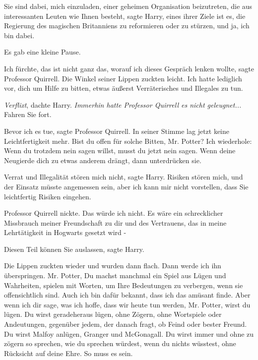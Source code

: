 \glqq{}Sie sind dabei, mich einzuladen, einer geheimen Organisation beizutreten,
die aus interessanten Leuten wie Ihnen besteht\grqq{}, sagte Harry, \glqq{}eines
ihrer Ziele ist es, die Regierung des magischen Britanniens zu reformieren oder
zu stürzen, und ja, ich bin dabei.\grqq{}

Es gab eine kleine Pause.

\glqq{}Ich fürchte, das ist nicht ganz das, worauf ich dieses Gespräch lenken
wollte\grqq{}, sagte Professor Quirrell. Die Winkel seiner Lippen zuckten
leicht. \glqq{}Ich hatte lediglich vor, dich um Hilfe zu bitten, etwas äußerst
Verräterisches und Illegales zu tun.\grqq{}

\emph{Verflixt}, dachte Harry.\emph{ Immerhin hatte Professor Quirrell es nicht
geleugnet...} \glqq{}Fahren Sie fort.\grqq{}

\glqq{}Bevor ich es tue\grqq{}, sagte Professor Quirrell. In seiner Stimme lag
jetzt keine Leichtfertigkeit mehr. \glqq{}Bist du offen für solche Bitten, Mr.
Potter? Ich wiederhole: Wenn du trotzdem nein sagen willst, musst du jetzt nein
sagen. Wenn deine Neugierde dich zu etwas anderem drängt, dann unterdrücken
sie.\grqq{}

\glqq{}Verrat und Illegalität stören mich nicht\grqq{}, sagte Harry. \glqq{}
Risiken stören mich, und der Einsatz müsste angemessen sein, aber ich kann mir
nicht vorstellen, dass Sie leichtfertig Risiken eingehen.\grqq{}

Professor Quirrell nickte. \glqq{}Das würde ich nicht. Es wäre ein schrecklicher
Missbrauch meiner Freundschaft zu dir und des Vertrauens, das in meine
Lehrtätigkeit in Hogwarts gesetzt wird -\grqq{}

\glqq{}Diesen Teil können Sie auslassen\grqq{}, sagte Harry.

Die Lippen zuckten wieder und wurden dann flach. \glqq{}Dann werde ich ihn
überspringen. Mr. Potter, Du machst manchmal ein Spiel aus Lügen und Wahrheiten,
spielen mit Worten, um Ihre Bedeutungen zu verbergen, wenn sie offensichtlich
sind. Auch ich bin dafür bekannt, dass ich das amüsant finde. Aber wenn ich dir
sage, was ich hoffe, dass wir heute tun werden, Mr. Potter, wirst du lügen. Du
wirst geradeheraus lügen, ohne Zögern, ohne Wortspiele oder Andeutungen,
gegenüber jedem, der danach fragt, ob Feind oder bester Freund. Du wirst Malfoy
anlügen, Granger und McGonagall. Du wirst immer und ohne zu zögern so sprechen,
wie du sprechen würdest, wenn du nichts wüsstest, ohne Rücksicht auf deine Ehre.
So muss es sein.\grqq{}

